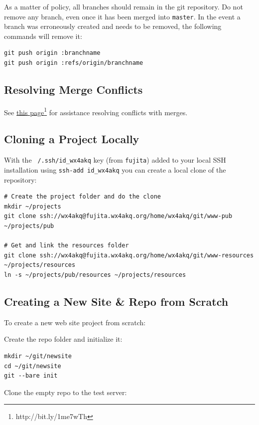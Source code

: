 \documentclass[pdflatex,letterpaper,twoside,12pt]{book}
\begin{document}
As a matter of policy, all branches should remain in the git repository.  Do not remove any branch, even once it has been merged into \texttt{master}. In the event a branch was erroneously created and needs to be removed, the following commands will remove it:

\begin{verbatim}
git push origin :branchname
git push origin :refs/origin/branchname
\end{verbatim}

\subsection{Resolving Merge Conflicts}

See \href{http://bit.ly/1me7wTh}{this page}\footnote{http://bit.ly/1me7wTh} for assistance resolving conflicts with merges.

\subsection{Cloning a Project Locally}

With the \texttt{~/.ssh/id\_wx4akq} key (from \texttt{fujita}) added to your local SSH installation using \texttt{ssh-add id\_wx4akq} you can create a local clone of the repository:

\begin{verbatim}
# Create the project folder and do the clone
mkdir ~/projects
git clone ssh://wx4akq@fujita.wx4akq.org/home/wx4akq/git/www-pub ~/projects/pub

# Get and link the resources folder
git clone ssh://wx4akq@fujita.wx4akq.org/home/wx4akq/git/www-resources ~/projects/resources
ln -s ~/projects/pub/resources ~/projects/resources
\end{verbatim}

\subsection{Creating a New Site \& Repo from Scratch}

To create a new web site project from scratch:

Create the repo folder and initialize it:

\begin{verbatim}
mkdir ~/git/newsite
cd ~/git/newsite
git --bare init
\end{verbatim}

Clone the empty repo to the test server:
\end{document}
